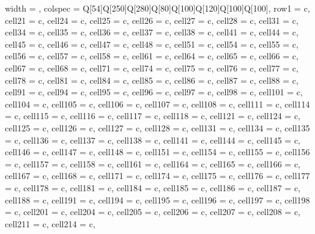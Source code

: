 \scriptsize{
\begin{longtblr}[
  label = none,
  entry = none,
]{
  width = \linewidth,
  colspec = {Q[54]Q[250]Q[280]Q[80]Q[100]Q[120]Q[100]Q[100]},
  row{1} = {c},
  cell{2}{1} = {c},
  cell{2}{4} = {c},
  cell{2}{5} = {c},
  cell{2}{6} = {c},
  cell{2}{7} = {c},
  cell{2}{8} = {c},
  cell{3}{1} = {c},
  cell{3}{4} = {c},
  cell{3}{5} = {c},
  cell{3}{6} = {c},
  cell{3}{7} = {c},
  cell{3}{8} = {c},
  cell{4}{1} = {c},
  cell{4}{4} = {c},
  cell{4}{5} = {c},
  cell{4}{6} = {c},
  cell{4}{7} = {c},
  cell{4}{8} = {c},
  cell{5}{1} = {c},
  cell{5}{4} = {c},
  cell{5}{5} = {c},
  cell{5}{6} = {c},
  cell{5}{7} = {c},
  cell{5}{8} = {c},
  cell{6}{1} = {c},
  cell{6}{4} = {c},
  cell{6}{5} = {c},
  cell{6}{6} = {c},
  cell{6}{7} = {c},
  cell{6}{8} = {c},
  cell{7}{1} = {c},
  cell{7}{4} = {c},
  cell{7}{5} = {c},
  cell{7}{6} = {c},
  cell{7}{7} = {c},
  cell{7}{8} = {c},
  cell{8}{1} = {c},
  cell{8}{4} = {c},
  cell{8}{5} = {c},
  cell{8}{6} = {c},
  cell{8}{7} = {c},
  cell{8}{8} = {c},
  cell{9}{1} = {c},
  cell{9}{4} = {c},
  cell{9}{5} = {c},
  cell{9}{6} = {c},
  cell{9}{7} = {c},
  cell{9}{8} = {c},
  cell{10}{1} = {c},
  cell{10}{4} = {c},
  cell{10}{5} = {c},
  cell{10}{6} = {c},
  cell{10}{7} = {c},
  cell{10}{8} = {c},
  cell{11}{1} = {c},
  cell{11}{4} = {c},
  cell{11}{5} = {c},
  cell{11}{6} = {c},
  cell{11}{7} = {c},
  cell{11}{8} = {c},
  cell{12}{1} = {c},
  cell{12}{4} = {c},
  cell{12}{5} = {c},
  cell{12}{6} = {c},
  cell{12}{7} = {c},
  cell{12}{8} = {c},
  cell{13}{1} = {c},
  cell{13}{4} = {c},
  cell{13}{5} = {c},
  cell{13}{6} = {c},
  cell{13}{7} = {c},
  cell{13}{8} = {c},
  cell{14}{1} = {c},
  cell{14}{4} = {c},
  cell{14}{5} = {c},
  cell{14}{6} = {c},
  cell{14}{7} = {c},
  cell{14}{8} = {c},
  cell{15}{1} = {c},
  cell{15}{4} = {c},
  cell{15}{5} = {c},
  cell{15}{6} = {c},
  cell{15}{7} = {c},
  cell{15}{8} = {c},
  cell{16}{1} = {c},
  cell{16}{4} = {c},
  cell{16}{5} = {c},
  cell{16}{6} = {c},
  cell{16}{7} = {c},
  cell{16}{8} = {c},
  cell{17}{1} = {c},
  cell{17}{4} = {c},
  cell{17}{5} = {c},
  cell{17}{6} = {c},
  cell{17}{7} = {c},
  cell{17}{8} = {c},
  cell{18}{1} = {c},
  cell{18}{4} = {c},
  cell{18}{5} = {c},
  cell{18}{6} = {c},
  cell{18}{7} = {c},
  cell{18}{8} = {c},
  cell{19}{1} = {c},
  cell{19}{4} = {c},
  cell{19}{5} = {c},
  cell{19}{6} = {c},
  cell{19}{7} = {c},
  cell{19}{8} = {c},
  cell{20}{1} = {c},
  cell{20}{4} = {c},
  cell{20}{5} = {c},
  cell{20}{6} = {c},
  cell{20}{7} = {c},
  cell{20}{8} = {c},
  cell{21}{1} = {c},
  cell{21}{4} = {c},
}
\end{longtblr}}
